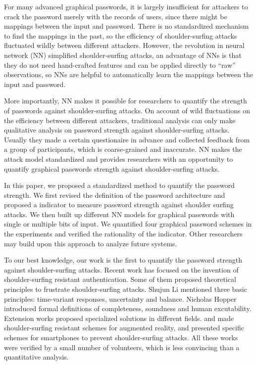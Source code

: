 \documentclass{article}
\begin{document}
  For many advanced graphical passwords, it is largely insufficient for attackers to crack the password merely 
  with the records of users, since there might be mappings between the input and password. There is no 
  standardized mechanism to find the mappings in the past, so the efficiency of shoulder-surfing attacks fluctuated 
  wildly between different attackers. However, the revolution in neural network (NN) simplified 
  shoulder-surfing attacks, an advantage of NNs is that they do not need hand-crafted features and can be 
  applied directly to “raw” observations, so NNs are helpful to automatically learn the mappings between the 
  input and password. 
  
  More importantly, NN makes it possible for researchers to quantify the strength of passwords against 
  shoulder-surfing attacks. On account of wild fluctuations on the efficiency between different attackers, 
  traditional analysis can only make qualitative analysis on password strength against shoulder-surfing attacks. 
  Usually they made a certain questionaire in advance and collected feedback from a group of participants, which 
  is coarse-grained and inaccurate. NN makes the attack model standardized and provides researchers with an opportunity 
  to quantify graphical passwords strength against shoulder-surfing attacks. 
  
  In this paper, we proposed a standardized method to quantify the password strength. We first revised the 
  definition of the password architecture and proposed a indicator to measure password strength against 
  shoulder surfing attacks. We then built up different NN models for graphical passwords with 
  single or multiple bits of input. We quantified four graphical password schemes in the experiments and verified 
  the rationality of the indicator. Other researchers may build upon this approach to analyze future systems.
  
  To our best knowledge, our work is the first to quantify the password strength against shoulder-surfing 
  attacks. Recent work has focused on the invention of shoulder-surfing resistant authentication. Some of them 
  proposed theoretical principles to frustrate shoulder-surfing attacks. Shujun Li \cite{DBLP:journals/iacr/LiS05} 
  mentioned three basic principles: time-variant responses, uncertainty and balance. Nicholas Hopper 
  \cite{Hopper:2001:SHI:647097.717000} introduced formal definitions of completeness, soundness and human 
  excutability. Extension works proposed specialized solutions in different fields. 
  \cite{DBLP:conf/icc/ZhangZDLHK17} and \cite{DBLP:conf/percom/MaitiJW17} made shoulder-surfing resistant schemes 
  for augmented reality, \cite{DBLP:journals/mta/LuoY16} and \cite{DBLP:conf/ic-nc/HigashiyamaYOF15} presented 
  specific schemes for smartphones to prevent shoulder-surfing attacks. All these works were verified by a small 
  number of volunteers, which is less convincing than a quantitative analysis.
  
\end{document}
